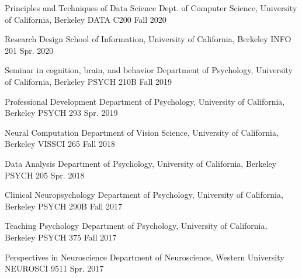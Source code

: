 
\begin{cvhonors}

 \cvhonor
    {Principles and Techniques of Data Science} %
    {Dept. of Computer Science, University of California, Berkeley}
    {DATA C200}
  	{Fall 2020}
  	
 \cvhonor
    {Research Design} %
    {School of Information, University of California, Berkeley}
    {INFO 201}
  	{Spr. 2020}
  	
 \cvhonor
    {Seminar in cognition, brain, and behavior} %
    {Department of Psychology, University of California, Berkeley}
    {PSYCH 210B}
  	{Fall 2019}
  	
 \cvhonor
    {Professional Development} %
    {Department of Psychology, University of California, Berkeley}
    {PSYCH 293}
  	{Spr. 2019}
  	
 \cvhonor
    {Neural Computation} %
    {Department of Vision Science, University of California, Berkeley}
    {VISSCI 265}
  	{Fall 2018}
  	
 \cvhonor
    {Data Analysis} %
    {Department of Psychology, University of California, Berkeley}
    {PSYCH 205}
  	{Spr. 2018}

 \cvhonor
    {Clinical Neuropsychology} %
    {Department of Psychology, University of California, Berkeley}
    {PSYCH 290B}
  	{Fall 2017}
  	
 \cvhonor
    {Teaching Psychology} %
    {Department of Psychology, University of California, Berkeley}
    {PSYCH 375}
  	{Fall 2017}
	
 \cvhonor
    {Perspectives in Neuroscience} %
    {Department of Neuroscience, Western University}
    {NEUROSCI 9511}
  	{Spr. 2017}
  	

\end{cvhonors}
